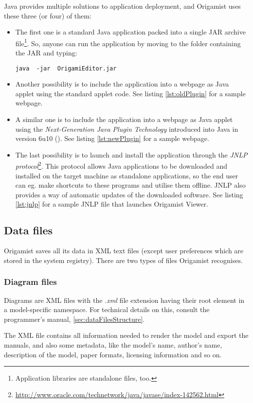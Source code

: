 Java provides multiple solutions to application deployment, and Origamist
uses these three (or four) of them:
\begin{itemize}
\item  The first one is a standard Java application packed into a single JAR archive file\footnote{Application libraries are standalone files, too.}. So, anyone can run the application by moving to the folder containing the JAR and typing:
\begin{verbatim}
java  -jar  OrigamiEditor.jar
\end{verbatim}
\item Another possibility is to include the application into a webpage as Java
applet using the standard applet code. See listing \ref{lst:oldPlugin} for a sample webpage.
\item A similar one is to include the application into a webpage as Java applet
using the \emph{Next-Generation Java Plugin Technology} introduced into Java
in version 6u10 (\cite{newjava}). See listing \ref{lst:newPlugin} for a sample webpage.
\item The last possibility is to launch and install the application through the
\emph{JNLP protocol}\footnote{\url{http://www.oracle.com/technetwork/java/javase/index-142562.html}}.  This protocol allows Java applications to be downloaded and installed on the target machine as standalone applications, so the end user can eg. make shortcuts to these programs and utilise them offline. JNLP also provides a way of automatic updates of the downloaded software. See listing \ref{lst:jnlp} for a sample JNLP file that launches Origamist Viewer.
\end{itemize}

\subsection{Data files}
Origamist saves all its data in XML text files (except user preferences which are stored in the system registry). There are two types of files Origamist recognises.

\subsubsection{Diagram files}
Diagrams are XML files with the \emph{.xml} file extension having their root element in a model-specific namespace. For technical details on this, consult the programmer's manual, \ref{sec:dataFilesStructure}.

The XML file contains all information needed to render the model and export
the manuals, and also some metadata, like the model's name, author's name, description of the model, paper formats, licensing information and so on.

